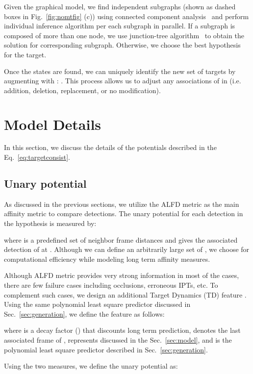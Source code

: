 \documentclass[10pt,twocolumn,letterpaper]{article}
\begin{document}
Given the graphical model, we find independent subgraphs (shown as dashed boxes in Fig.~\ref{fig:nomtfig} (c)) using connected component analysis~\cite{hopcroft1973algorithm} and perform individual inference algorithm per each subgraph in parallel. If a subgraph is composed of more than one node, we use junction-tree algorithm~\cite{koller2009probabilistic,LIBDAI} to obtain the solution for corresponding subgraph. Otherwise, we choose the best hypothesis for the target.

Once the states  are found, we can uniquely identify the new set of targets by augmenting  with :  . This process allows us to adjust any associations of  in  (i.e. addition, deletion, replacement, or no modification).

\section{Model Details}
\label{sec:details}
In this section, we discuss the details of the potentials described in the Eq.~\ref{eq:targetconsist}.

\subsection{Unary potential}
\label{sec:unary}

As discussed in the previous sections, we utilize the ALFD metric as the main affinity metric to compare detections. The unary potential for each detection in the hypothesis is measured by:

{\footnotesize
}
where  is a predefined set of neighbor frame distances and  gives the associated detection of  at . Although we can define an arbitrarily large set of , we choose  for computational efficiency while modeling long term affinity measures. 

Although ALFD metric provides very strong information in most of the cases, there are few failure cases including occlusions, erroneous IPTs, etc. To complement such cases, we design an additional Target Dynamics (TD) feature . Using the same polynomial least square predictor discussed in Sec.~\ref{sec:generation}, we define the feature as follows:

{\footnotesize
}
where  is a decay factor () that discounts long term prediction,  denotes the last associated frame of ,  represents  discussed in the Sec.~\ref{sec:model}, and  is the polynomial least square predictor described in Sec.~\ref{sec:generation}. 

Using the two measures, we define the unary potential  as:
\end{document}
